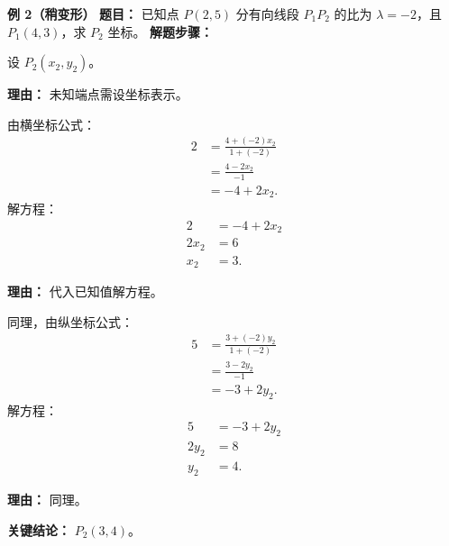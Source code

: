\begin{examplebox}
	\medskip
	\textbf{\textcolor{CExample}{例 2（稍变形）}}
	\textbf{\textcolor{CExample}{题目：}}
	已知点 $P(2,5)$ 分有向线段 $P_1P_2$ 的比为 $\lambda=-2$，且 $P_1(4,3)$，求 $P_2$ 坐标。
	\textbf{\textcolor{CExample}{解题步骤：}}
	\begin{description}[style=nextline, leftmargin=2.8em, labelsep=0.5em, itemsep=0.45em]
		\item[\textbf{第一步（设坐标）：}]
			设 $P_2(x_2,y_2)$。
			\par\textbf{理由：} 未知端点需设坐标表示。
		\item[\textbf{第二步（利用横坐标公式）：}]
			由横坐标公式：
			\[
				\begin{aligned}
					2 &= \frac{4 + (-2)x_2}{1+(-2)} \\ &= \frac{4-2x_2}{-1} \\ &= -4+2x_2.
			\end{aligned}
			\]
			解方程：
			\[
				\begin{aligned}
					2 &= -4+2x_2 \\ 2x_2 &= 6 \\ x_2 &= 3.
			\end{aligned}
			\]
			\par\textbf{理由：} 代入已知值解方程。
		\item[\textbf{第三步（利用纵坐标公式）：}]
			同理，由纵坐标公式：
			\[
				\begin{aligned}
					5 &= \frac{3 + (-2)y_2}{1+(-2)} \\ &= \frac{3-2y_2}{-1} \\ &= -3+2y_2.
			\end{aligned}
			\]
			解方程：
			\[
				\begin{aligned}
					5 &= -3+2y_2 \\ 2y_2 &= 8 \\ y_2 &= 4.
			\end{aligned}
			\]
			\par\textbf{理由：} 同理。
	\end{description}
	\textbf{\textcolor{CExample}{关键结论：}}
	\textbf{$P_2(3,4)$}。


\end{examplebox}
